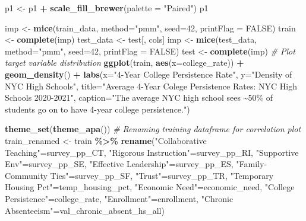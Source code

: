 \documentclass[
  man,floatsintext]{apa6}
\newenvironment{Shaded}{\begin{snugshade}}{\end{snugshade}}
\newcommand{\AttributeTok}[1]{\textcolor[rgb]{0.13,0.29,0.53}{#1}}
\newcommand{\CommentTok}[1]{\textcolor[rgb]{0.56,0.35,0.01}{\textit{#1}}}
\newcommand{\ConstantTok}[1]{\textcolor[rgb]{0.56,0.35,0.01}{#1}}
\newcommand{\DecValTok}[1]{\textcolor[rgb]{0.00,0.00,0.81}{#1}}
\newcommand{\FunctionTok}[1]{\textcolor[rgb]{0.13,0.29,0.53}{\textbf{#1}}}
\newcommand{\NormalTok}[1]{#1}
\newcommand{\OtherTok}[1]{\textcolor[rgb]{0.56,0.35,0.01}{#1}}
\newcommand{\SpecialCharTok}[1]{\textcolor[rgb]{0.81,0.36,0.00}{\textbf{#1}}}
\newcommand{\StringTok}[1]{\textcolor[rgb]{0.31,0.60,0.02}{#1}}
\begin{document}
\begin{Shaded}
\begin{Highlighting}[]
\NormalTok{p1 }\OtherTok{\textless{}{-}}\NormalTok{ p1 }\SpecialCharTok{+} 
    \FunctionTok{scale\_fill\_brewer}\NormalTok{(}\AttributeTok{palette =} \StringTok{"Paired"}\NormalTok{)}
\NormalTok{p1}

\NormalTok{imp }\OtherTok{\textless{}{-}} \FunctionTok{mice}\NormalTok{(train\_data, }\AttributeTok{method=}\StringTok{"pmm"}\NormalTok{, }\AttributeTok{seed=}\DecValTok{42}\NormalTok{, }\AttributeTok{printFlag =} \ConstantTok{FALSE}\NormalTok{)}
\NormalTok{train }\OtherTok{\textless{}{-}} \FunctionTok{complete}\NormalTok{(imp)}
\NormalTok{test\_data }\OtherTok{\textless{}{-}}\NormalTok{ test[, cols]}
\NormalTok{imp }\OtherTok{\textless{}{-}} \FunctionTok{mice}\NormalTok{(test\_data, }\AttributeTok{method=}\StringTok{"pmm"}\NormalTok{, }\AttributeTok{seed=}\DecValTok{42}\NormalTok{, }\AttributeTok{printFlag =} \ConstantTok{FALSE}\NormalTok{)}
\NormalTok{test }\OtherTok{\textless{}{-}} \FunctionTok{complete}\NormalTok{(imp)}
\CommentTok{\# Plot target variable distribution}
\FunctionTok{ggplot}\NormalTok{(train, }\FunctionTok{aes}\NormalTok{(}\AttributeTok{x=}\NormalTok{college\_rate)) }\SpecialCharTok{+} 
    \FunctionTok{geom\_density}\NormalTok{() }\SpecialCharTok{+} 
    \FunctionTok{labs}\NormalTok{(}\AttributeTok{x=}\StringTok{"4{-}Year College Persistence Rate"}\NormalTok{,}
         \AttributeTok{y=}\StringTok{"Density of NYC High Schools"}\NormalTok{,}
         \AttributeTok{title=}\StringTok{"Average 4{-}Year Colege Persistence Rates: NYC High Schools 2020{-}2021"}\NormalTok{,}
         \AttributeTok{caption=}\StringTok{"The average NYC high school sees \textasciitilde{}50\% of students go on to have 4{-}year college persistence."}\NormalTok{)}

\FunctionTok{theme\_set}\NormalTok{(}\FunctionTok{theme\_apa}\NormalTok{())}
\CommentTok{\# Renaming training dataframe for correlation plot}
\NormalTok{train\_renamed }\OtherTok{\textless{}{-}}\NormalTok{ train }\SpecialCharTok{\%\textgreater{}\%}
  \FunctionTok{rename}\NormalTok{(}\StringTok{"Collaborative Teaching"}\OtherTok{=}\NormalTok{survey\_pp\_CT,}
         \StringTok{"Rigorous Instruction"}\OtherTok{=}\NormalTok{survey\_pp\_RI,}
         \StringTok{"Supportive Env"}\OtherTok{=}\NormalTok{survey\_pp\_SE,}
         \StringTok{"Effective Leadership"}\OtherTok{=}\NormalTok{survey\_pp\_ES,}
         \StringTok{"Family{-}Community Ties"}\OtherTok{=}\NormalTok{survey\_pp\_SF,}
         \StringTok{"Trust"}\OtherTok{=}\NormalTok{survey\_pp\_TR,}
         \StringTok{"Temporary Housing Pct"}\OtherTok{=}\NormalTok{temp\_housing\_pct,}
         \StringTok{"Economic Need"}\OtherTok{=}\NormalTok{economic\_need,}
         \StringTok{"College Persistence"}\OtherTok{=}\NormalTok{college\_rate,}
         \StringTok{"Enrollment"}\OtherTok{=}\NormalTok{enrollment,}
         \StringTok{"Chronic Absenteeism"}\OtherTok{=}\NormalTok{val\_chronic\_absent\_hs\_all)}


\end{Highlighting}
\end{Shaded}
\end{document}
